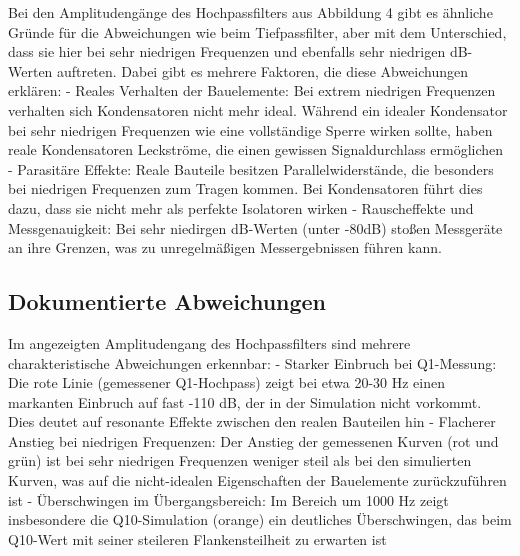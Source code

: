 \documentclass[
  ngerman,
  letterpaper,
  DIV=11]{scrreprt}
\begin{document}
Bei den Amplitudengänge des Hochpassfilters aus Abbildung 4 gibt es
ähnliche Gründe für die Abweichungen wie beim Tiefpassfilter, aber mit
dem Unterschied, dass sie hier bei sehr niedrigen Frequenzen und
ebenfalls sehr niedrigen dB-Werten auftreten. Dabei gibt es mehrere
Faktoren, die diese Abweichungen erklären: - Reales Verhalten der
Bauelemente: Bei extrem niedrigen Frequenzen verhalten sich
Kondensatoren nicht mehr ideal. Während ein idealer Kondensator bei sehr
niedrigen Frequenzen wie eine vollständige Sperre wirken sollte, haben
reale Kondensatoren Leckströme, die einen gewissen Signaldurchlass
ermöglichen - Parasitäre Effekte: Reale Bauteile besitzen
Parallelwiderstände, die besonders bei niedrigen Frequenzen zum Tragen
kommen. Bei Kondensatoren führt dies dazu, dass sie nicht mehr als
perfekte Isolatoren wirken - Rauscheffekte und Messgenauigkeit: Bei sehr
niedirgen dB-Werten (unter -80dB) stoßen Messgeräte an ihre Grenzen, was
zu unregelmäßigen Messergebnissen führen kann.

\subsection{Dokumentierte
Abweichungen}\label{dokumentierte-abweichungen-1}

Im angezeigten Amplitudengang des Hochpassfilters sind mehrere
charakteristische Abweichungen erkennbar: - Starker Einbruch bei
Q1-Messung: Die rote Linie (gemessener Q1-Hochpass) zeigt bei etwa 20-30
Hz einen markanten Einbruch auf fast -110 dB, der in der Simulation
nicht vorkommt. Dies deutet auf resonante Effekte zwischen den realen
Bauteilen hin - Flacherer Anstieg bei niedrigen Frequenzen: Der Anstieg
der gemessenen Kurven (rot und grün) ist bei sehr niedrigen Frequenzen
weniger steil als bei den simulierten Kurven, was auf die nicht-idealen
Eigenschaften der Bauelemente zurückzuführen ist - Überschwingen im
Übergangsbereich: Im Bereich um 1000 Hz zeigt insbesondere die
Q10-Simulation (orange) ein deutliches Überschwingen, das beim Q10-Wert
mit seiner steileren Flankensteilheit zu erwarten ist
\end{document}
